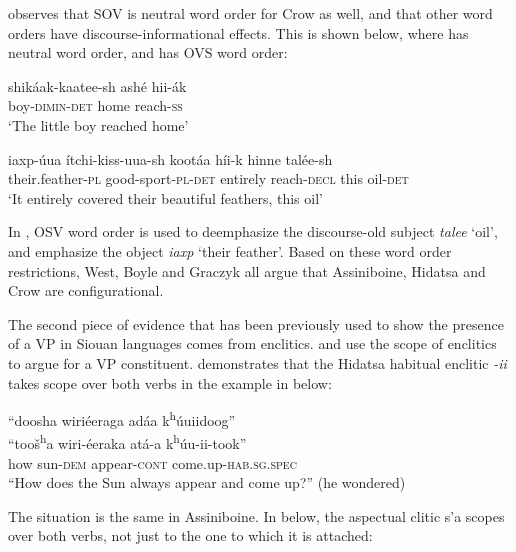\documentclass[output=paper]{LSP/langsci}
\begin{document}
\citet{Graczyk1991a} observes that SOV is neutral word order for Crow as well, and that other word orders have discourse-informational effects.  This is shown below, where  has neutral word order, and  has OVS word order:

\begin{exe}
\ex\label{ex:jrs:25} \gll shik\'aak-kaatee-sh ash\'e 		hii-\'ak \\
boy-\textsc{dimin-det} 		home 	reach-\textsc{ss} \\
\trans `The little boy reached home' \citep[101]{Graczyk1991a}

\ex\label{ex:jrs:26} \gll iaxp-\'uua 		\'itchi-kiss-uua-sh			koot\'aa 	h\'ii-k 	hinne		tal\'ee-sh \\
their.feather-\textsc{pl} good-sport-\textsc{pl}-\textsc{det}		entirely 	reach-\textsc{decl}	this 	oil-\textsc{det} \\
\trans `It entirely covered their beautiful feathers, this oil' \citep[103]{Graczyk1991a}
\end{exe}

In , OSV word order is used to deemphasize the discourse-old subject \textit{talee} `oil', and emphasize the object \textit{iaxp} `their feather'.  Based on these word order restrictions, West, Boyle and Graczyk all argue that Assiniboine, Hidatsa and Crow are configurational. 
	
The second piece of evidence that has been previously used to show the presence of a VP in Siouan languages comes from enclitics. \citet{West2003} and \citet{Boyle2007} use the scope of enclitics to argue for a VP constituent. \citet{Boyle2007} demonstrates that the Hidatsa habitual enclitic \textit{-ii} takes scope over both verbs in the example in  below:

\begin{exe}
\ex\label{ex:jrs:27} 
\glll ``doosha	wiri\'eeraga 	ad\'aa 	 k\textsuperscript{h}\'uuiidoog''\\
``too\v{s}\textsuperscript{h}a 	wiri-\'eeraka 	at\'a-a k\textsuperscript{h}\'uu-ii-took'' \\
how 	sun-\textsc{dem} 	appear-\textsc{cont}  come.up-\textsc{hab.sg.spec} \\
\trans ``How does the Sun always appear and come up?'' (he wondered) \citep[223]{Boyle2007}
\end{exe}

The situation is the same in Assiniboine.  In  below, the aspectual clitic s'a scopes over both verbs, not just to the one to which it is attached:
\end{document}

